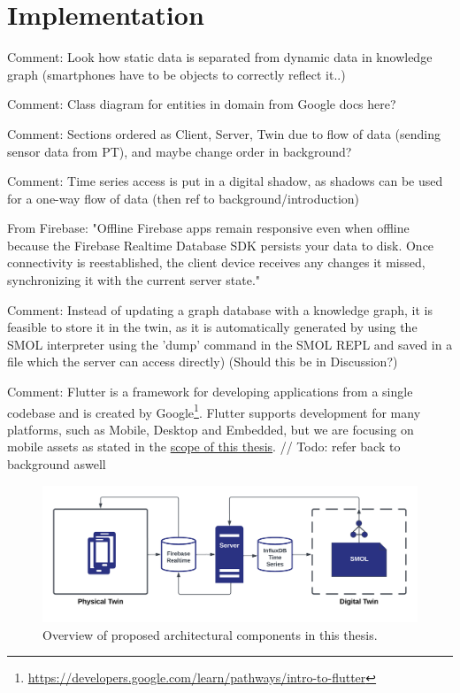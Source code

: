 \documentclass{article}
\begin{document}
\newpage
\section{Implementation}\label{sec:Implementation}
Comment: Look how static data is separated from dynamic data in knowledge graph (smartphones have to be objects to correctly reflect it..)

Comment: Class diagram for entities in domain from Google docs here?

Comment: Sections ordered as Client, Server, Twin due to flow of data (sending sensor data from PT), and maybe change order in background?

Comment: Time series access is put in a digital shadow, as shadows can be used for a one-way flow of data (then ref to background/introduction)

From Firebase: "Offline	Firebase apps remain responsive even when offline because the Firebase Realtime Database SDK persists your data to disk. Once connectivity is reestablished, the client device receives any changes it missed, synchronizing it with the current server state." 

Comment: Instead of updating a graph database with a knowledge graph, it is feasible to store it in the twin, as it is automatically generated by using the SMOL interpreter using the 'dump' command in the SMOL REPL and saved in a file which the server can access directly) (Should this be in Discussion?)

Comment: Flutter is a framework for developing applications from a single codebase and is created by Google\footnote{\url{https://developers.google.com/learn/pathways/intro-to-flutter}}. Flutter supports development for many platforms, such as Mobile, Desktop and Embedded, but we are focusing on mobile assets as stated in the \hyperref[subsec:Scope]{scope of this thesis}.
// Todo: refer back to background aswell

\begin{figure}[H]
    \centering
    \includegraphics[scale=0.12]{graphics/thesis_overview.png}
    \caption{Overview of proposed architectural components in this thesis.}
    \label{fig:components}
\end{figure}
\end{document}

